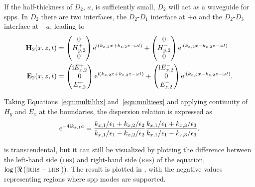 If the half-thickness of $D_2$, $a$, is sufficiently small, $D_2$ will act
as a waveguide for \glspl{spp}.  In $D_2$ there are two interfaces, the
$D_2$-$D_1$ interface at $+a$ and the $D_2$-$D_3$ interface at $-a$,
leading to
\begin{align}
  \mathbf{H}_2(x,z,t) & =
  \begin{pmatrix}
    0         \\
    H^+_{y,2} \\
    0
  \end{pmatrix} {\mathrm{e}}^{{\mathrm{i}}(k_{x,2}x+k_{z,2}z-\omega t)}
  +
  \begin{pmatrix}
    0         \\
    H^-_{y,2} \\
    0
  \end{pmatrix} {\mathrm{e}}^{{\mathrm{i}}(k_{x,2}x-k_{z,2}z-\omega t)} \label{eqn:multihhx} \\
  \mathbf{E}_2(x,z,t) & =
  \begin{pmatrix}
    {\mathrm{i}} E^+_{x,2} \\
    0             \\
    E^+_{z,2}     \\
  \end{pmatrix} {\mathrm{e}}^{{\mathrm{i}}(k_{x,2}x+k_{z,2}z-\omega t)}
  +
  \begin{pmatrix}
    {\mathrm{i}} E^-_{x,2} \\
    0             \\
    E^-_{z,2}     \\
  \end{pmatrix} {\mathrm{e}}^{{\mathrm{i}}(k_{x,2}x-k_{z,2}z-\omega t)}.
  \label{eqn:multieex}
\end{align}

Taking Equations~\ref{eqn:multihhx} and~\ref{eqn:multieex} and applying
continuity of $H_y$ and $E_x$ at the boundaries, the dispersion relation is
expressed as
\begin{equation}
  {\mathrm{e}}^{-4 {\mathrm{i}} k_{x,1} a} =
  \frac{k_{x,1}/\epsilon_1 + k_{x,2}/\epsilon_2}
  {k_{x,1}/\epsilon_1 - k_{x,2}/\epsilon_2}
  \frac{k_{x,1}/\epsilon_1 + k_{x,3}/\epsilon_3}
  {k_{x,1}/\epsilon_1 - k_{x,3}/\epsilon_3}.
  \label{eqn:lrsppdispersion}
\end{equation}

 is transcendental, but it can still be
visualized by plotting the difference between the left-hand side (\textsc{lhs}) and
right-hand side (\textsc{rhs}) of the equation,
$\log\left(\Re\left(|\mathrm{\textsc{rhs}}-\mathrm{\textsc{lhs}}|\right)\right)$.  The result
is plotted in , with the negative
values representing regions where \gls{spp} modes are supported.

